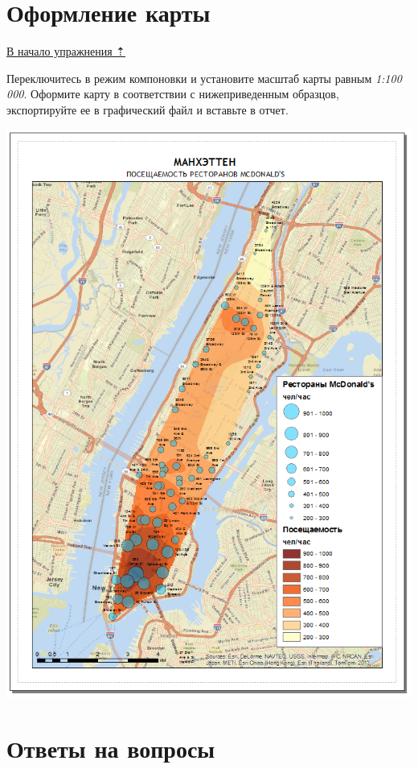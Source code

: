 \documentclass[]{book}
\theoremstyle{definition}
\theoremstyle{definition}
\theoremstyle{definition}
\theoremstyle{remark}
\begin{document}
\hypertarget{geocoding-design}{%
\section{Оформление карты}\label{geocoding-design}}

\protect\hyperlink{geocoding}{В начало упражнения ⇡}

Переключитесь в режим компоновки и установите масштаб карты равным
\emph{1:100 000}. Оформите карту в соответствии с нижеприведенным
образцов, экспортируйте ее в графический файл и вставьте в отчет.

\includegraphics{images/Ex14/image27.png}

\hypertarget{geocoding-questions}{%
\section{Ответы на вопросы}\label{geocoding-questions}}
\end{document}
